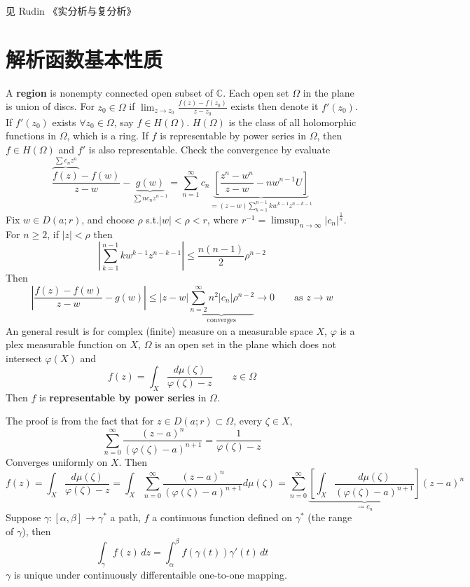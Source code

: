 见 Rudin 《实分析与复分析》

\section{解析函数基本性质}

A \textbf{region} is  nonempty connected open subset of $\mathbb{C}$. Each open set $\Omega$ in the plane is union of discs. For $z_0\in \Omega$ if $\lim_{ z \to z_0 }\frac{f(z)-f(z_0)}{z-z_0}$ exists then denote it $f'(z_0)$. If $f'(z_0)$ exists $\forall z_0\in \Omega$, say $f\in H(\Omega)$. $H(\Omega)$ is the class of all holomorphic functions in $\Omega$, which is a ring. If $f$ is representable by power series in $\Omega$, then $f\in H (\Omega)$ and $f'$ is also representable. Check the convergence by evaluate
\[
\frac{\overbrace{ f(z) }^{ \sum c_nz^{n} }-f(w)}{z-w}-\underbrace{ g(w) }_{  \sum nc_nz^{n-1} }=\sum_{n=1}^{\infty} c_n\underbrace{ \left[ \frac{z^{n}-w^{n}}{z-w}-nw^{n-1}U \right] }_{ =(z-w)\sum_{k=1}^{n-1} kw^{k-1}z^{n-k-1} }
\]
Fix $w\in D(a;r)$, and choose $\rho$ s.t.$\lvert w \rvert<\rho<r$, where $r^{-1}=\limsup_{ n \to \infty }\lvert c_n \rvert ^{\frac{1}{n}}$. For $n\geq2$, if $\lvert z \rvert<\rho$ then
\[
\left\lvert  \sum_{k=1}^{n-1} kw^{k-1}z^{n-k-1}  \right\rvert \leq \frac{n(n-1)}{2}\rho^{n-2}
\]
Then
\[
\left\lvert  \frac{f(z)-f(w)}{z-w}-g(w)  \right\rvert \leq \lvert z-w \rvert \underbrace{ \sum_{n=2}^{\infty} n^2\lvert c_n \rvert \rho^{n-2} }_{ \text{converges} }\to0\qquad \text{as }z\to w
\]
An general result is for complex (finite) measure on a measurable space $X$, $\varphi$ is a plex measurable function on $X$, $\Omega$ is an open set in the plane which does not intersect $\varphi(X)$ and
\[
f(z)=\int_{X}^{} \frac{d\mu(\zeta)}{\varphi(\zeta)-z}\qquad z\in \Omega
\]
Then $f$ is \textbf{representable by power series} in $\Omega$.

The proof is from the fact that for $z\in D(a;r)\subset \Omega$, every $\zeta\in X$,
\[
\sum_{n=0}^{\infty} \frac{(z-a)^{n}}{(\varphi(\zeta)-a)^{n+1}}=\frac{1}{\varphi(\zeta)-z}
\]
Converges uniformly on $X$. Then
\[
f(z)= \int_{X}^{} \frac{d\mu(\zeta)}{\varphi(\zeta)-z}=\int_{X}^{}\sum_{n=0}^{\infty} \frac{(z-a)^{n}}{(\varphi(\zeta)-a)^{n+1}}d\mu(\zeta)=\sum_{n=0}^{\infty}\underbrace{  \left[ \int_{X}^{} \frac{d\mu(\zeta)}{(\varphi(\zeta)-a)^{n+1}}  \right] }_{ \coloneqq c_n }(z-a)^{n}
\]
Suppose $\gamma:[\alpha,\beta]\to\gamma^{*}$ a path, $f$ a continuous function defined on $\gamma^{*}$ (the range of $\gamma$), then
\[
\int_{\gamma}^{} f(z) \, dz =\int_{\alpha}^{\beta} f(\gamma(t))\gamma'(t) \, dt 
\]
$\gamma$ is unique under continuously differentaible one-to-one mapping.

